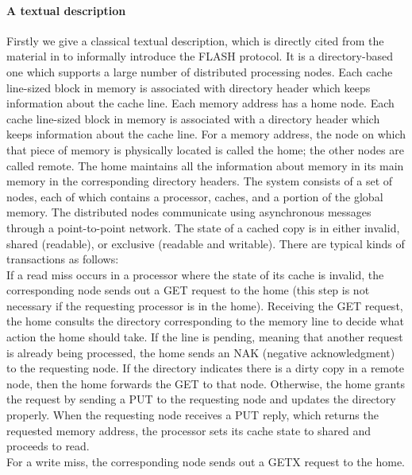 \documentclass{llncs}
\newcommand{\bedt}[1]{{\color{black}#1}}
\begin{document}
\paragraph*{A textual description}Firstly we give a classical textual description, which is directly cited from the material in \cite{Park2000} to informally introduce the FLASH protocol. 
It is a directory-based one which supports a large number of distributed processing nodes. Each cache line-sized block in memory is associated with directory header which keeps information about the \bedt{cache} line. Each memory address has a home node. Each cache line-sized block in memory is associated
with a directory header which keeps information about the \bedt{cache} line. For a memory \bedt{address}, the
node on which that piece of memory is physically located is called the home; the other
nodes are called remote. The home maintains all the information about memory in
its main memory in the corresponding directory headers.
The system consists of a set of nodes, each of which contains a processor, caches, and
a portion of the global memory. The distributed nodes communicate using asynchronous
messages through a point-to-point network. The state of a cached copy is in either invalid,
shared (readable), or exclusive (readable and writable). There are typical kinds of transactions as follows:\\%
 If a read miss occurs in a processor where the state of its cache is invalid, the corresponding node sends out a GET request to the
home (this step is not necessary if the requesting processor is in the home). Receiving the
GET request, the home consults the directory corresponding to the memory line to decide
what action the home should take. If the line is pending, meaning that another request
is already being processed, the home sends an NAK (negative acknowledgment) to the
requesting node. If the directory indicates there is a dirty copy in a remote node, then the
home forwards the GET to that node. Otherwise, the home grants the request by sending
a PUT to the requesting node and updates the directory properly. When the requesting
node receives a PUT reply, which returns the requested memory \bedt{address}, the processor sets
its cache state to shared and proceeds to read.\\%
 For a write miss, the corresponding node sends out a GETX request to the home.
\end{document}
